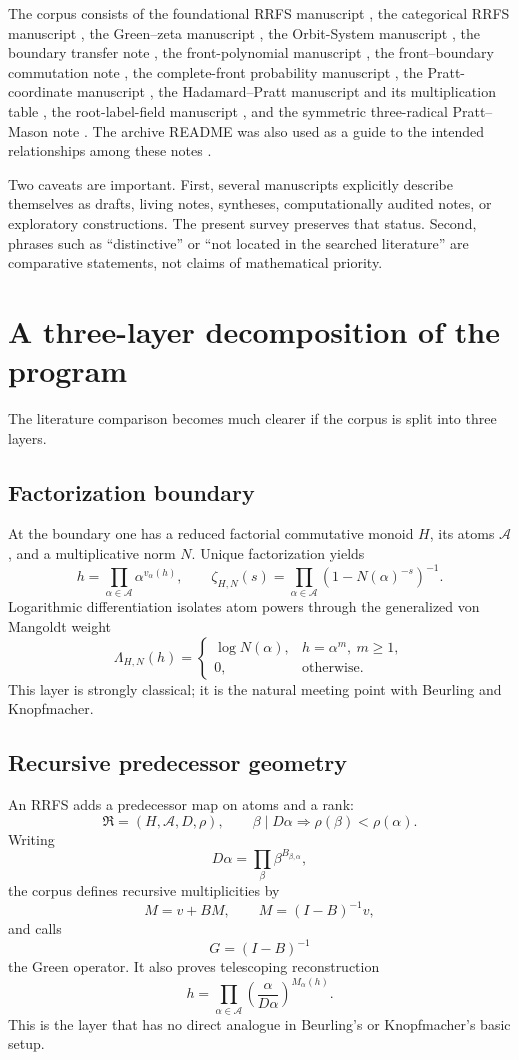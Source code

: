 \documentclass[11pt]{article}
\newcommand{\cA}{\mathcal A}
\newcommand{\cR}{\mathfrak R}
\begin{document}
The corpus consists of the foundational RRFS manuscript \cite{LekaRRFS}, the categorical RRFS manuscript \cite{LekaCategory}, the Green--zeta manuscript \cite{LekaGreen}, the Orbit-System manuscript \cite{LekaOS}, the boundary transfer note \cite{LekaBoundary}, the front-polynomial manuscript \cite{LekaFront}, the front--boundary commutation note \cite{LekaCommute}, the complete-front probability manuscript \cite{LekaFrontProb}, the Pratt-coordinate manuscript \cite{LekaCoordinates}, the Hadamard--Pratt manuscript and its multiplication table \cite{LekaHadamard,LekaTable}, the root-label-field manuscript \cite{LekaFields}, and the symmetric three-radical Pratt--Mason note \cite{LekaMason}. The archive README was also used as a guide to the intended relationships among these notes \cite{LekaREADME}.

Two caveats are important. First, several manuscripts explicitly describe themselves as drafts, living notes, syntheses, computationally audited notes, or exploratory constructions. The present survey preserves that status. Second, phrases such as ``distinctive'' or ``not located in the searched literature'' are comparative statements, not claims of mathematical priority.

\section{A three-layer decomposition of the program}
The literature comparison becomes much clearer if the corpus is split into three layers.

\subsection{Factorization boundary}
At the boundary one has a reduced factorial commutative monoid $H$, its atoms $\cA$, and a multiplicative norm $N$. Unique factorization yields
\[
 h=\prod_{\alpha\in\cA}\alpha^{v_\alpha(h)},\qquad
 \zeta_{H,N}(s)=\prod_{\alpha\in\cA}(1-N(\alpha)^{-s})^{-1}.
\]
Logarithmic differentiation isolates atom powers through the generalized von Mangoldt weight
\[
 \Lambda_{H,N}(h)=
 \begin{cases}
 \log N(\alpha),&h=\alpha^m,\ m\ge1,\\
 0,&\text{otherwise}.
 \end{cases}
\]
This layer is strongly classical; it is the natural meeting point with Beurling and Knopfmacher.

\subsection{Recursive predecessor geometry}
An RRFS adds a predecessor map on atoms and a rank:
\[
 \cR=(H,\cA,D,\rho),\qquad
 \beta\mid D\alpha\Longrightarrow \rho(\beta)<\rho(\alpha).
\]
Writing
\[
 D\alpha=\prod_\beta \beta^{B_{\beta,\alpha}},
\]
the corpus defines recursive multiplicities by
\[
 M=v+BM,\qquad M=(I-B)^{-1}v,
\]
and calls
\[
 G=(I-B)^{-1}
\]
the Green operator. It also proves telescoping reconstruction
\[
 h=\prod_{\alpha\in\cA}\left(\frac{\alpha}{D\alpha}\right)^{M_\alpha(h)}.
\]
This is the layer that has no direct analogue in Beurling's or Knopfmacher's basic setup.
\end{document}
